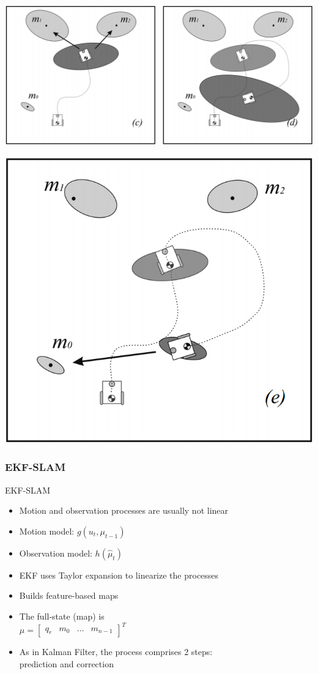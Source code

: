\documentclass[serif,aspectratio=169]{beamer}
\begin{document}
    \begin{frame}
        \centering
        \includegraphics[width=0.9\linewidth]{Images/fig26-slam-c-d.png}
    \end{frame}
    \begin{frame}
        \centering
        \includegraphics[width=0.4\linewidth]{Images/fig26-slam-e.png}
    \end{frame}

    \subsubsection{EKF-SLAM}
    \begin{frame}{EKF-SLAM}
         \begin{itemize}
             \item{Motion and observation processes are usually not linear}
             \item{Motion model: $g\left(u_t, \mu_{t-1}\right)$}
             \item{Observation model: $h\left(\hat\mu_t\right)$}
             \item{EKF uses Taylor expansion to linearize the processes}
             \item{Builds feature-based maps}
             \item{The full-state (map) is\\ $\mu = \begin{bmatrix} q_r & m_0 & \dots & m_{n-1}\end{bmatrix}^T$}
             \item{As in Kalman Filter, the process comprises 2 steps: \\prediction and correction}
         \end{itemize}
    \end{frame}
\end{document}
